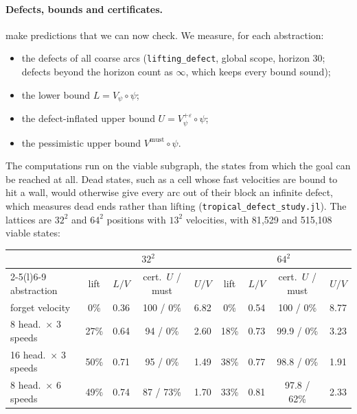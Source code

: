 \documentclass[11pt]{article}
\theoremstyle{definition}
\theoremstyle{remark}
\newcommand{\eps}{\varepsilon}
\newcommand{\Vm}{V^{\mathrm{must}}}
\begin{document}
\paragraph{Defects, bounds and certificates.}
 make predictions that we can
now check. We measure, for each abstraction:
\begin{itemize}[nosep]
\item the defects of all coarse arcs (\texttt{lifting\_defect}, global scope, horizon
  30; defects beyond the horizon count as $\infty$, which keeps every bound sound);
\item the lower bound $L = V_\psi \circ \psi$;
\item the defect-inflated upper bound $U = V^{+\eps}_\psi \circ \psi$;
\item the pessimistic upper bound $\Vm \circ \psi$.
\end{itemize}
The computations run on the viable subgraph, the states from which the goal can
be reached at all. Dead states, such as a cell whose fast velocities are bound to
hit a wall, would otherwise give every arc out of their block an infinite defect,
which measures dead ends rather than lifting (\texttt{tropical\_defect\_study.jl}).
The lattices are $32^2$ and $64^2$ positions with $13^2$ velocities, with 81{,}529
and 515{,}108 viable states:

\begin{center}
\small
\begin{tabular}{l@{\hspace{6pt}}cccc@{\hspace{10pt}}cccc}
\toprule
& \multicolumn{4}{c}{$32^2$} & \multicolumn{4}{c}{$64^2$} \\
\cmidrule(r){2-5}\cmidrule(l){6-9}
abstraction & lift & $L/V$ & cert.\ $U$ / must & $U/V$ & lift & $L/V$ & cert.\ $U$ / must & $U/V$ \\
\midrule
forget velocity & 0\% & 0.36 & 100 / 0\% & 6.82 & 0\% & 0.54 & 100 / 0\% & 8.77 \\
8 head.\ $\times$ 3 speeds & 27\% & 0.64 & 94 / 0\% & 2.60 & 18\% & 0.73 & 99.9 / 0\% & 3.23 \\
16 head.\ $\times$ 3 speeds & 50\% & 0.71 & 95 / 0\% & 1.49 & 38\% & 0.77 & 98.8 / 0\% & 1.91 \\
8 head.\ $\times$ 6 speeds & 49\% & 0.74 & 87 / 73\% & 1.70 & 33\% & 0.81 & 97.8 / 62\% & 2.33 \\
\bottomrule
\end{tabular}
\end{center}
\end{document}
